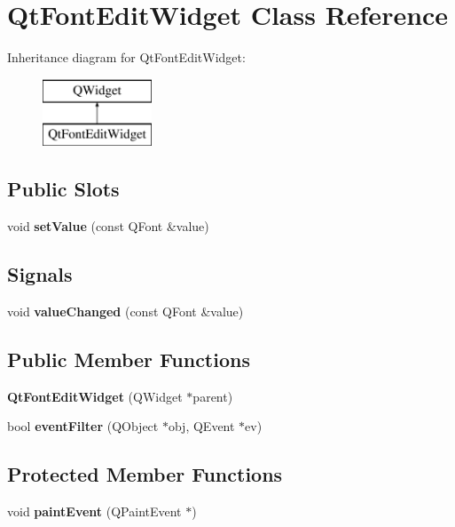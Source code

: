 \section{Qt\+Font\+Edit\+Widget Class Reference}
\label{classQtFontEditWidget}
Inheritance diagram for Qt\+Font\+Edit\+Widget\+:\begin{figure}[H]
\begin{center}
\leavevmode
\includegraphics[height=2.000000cm]{classQtFontEditWidget}
\end{center}
\end{figure}
\subsection*{Public Slots}
\begin{DoxyCompactItemize}
\item 
void {\bf set\+Value} (const Q\+Font \&value)
\end{DoxyCompactItemize}
\subsection*{Signals}
\begin{DoxyCompactItemize}
\item 
void {\bf value\+Changed} (const Q\+Font \&value)
\end{DoxyCompactItemize}
\subsection*{Public Member Functions}
\begin{DoxyCompactItemize}
\item 
{\bf Qt\+Font\+Edit\+Widget} (Q\+Widget $\ast$parent)
\item 
bool {\bf event\+Filter} (Q\+Object $\ast$obj, Q\+Event $\ast$ev)
\end{DoxyCompactItemize}
\subsection*{Protected Member Functions}
\begin{DoxyCompactItemize}
\item 
void {\bf paint\+Event} (Q\+Paint\+Event $\ast$)
\end{DoxyCompactItemize}


